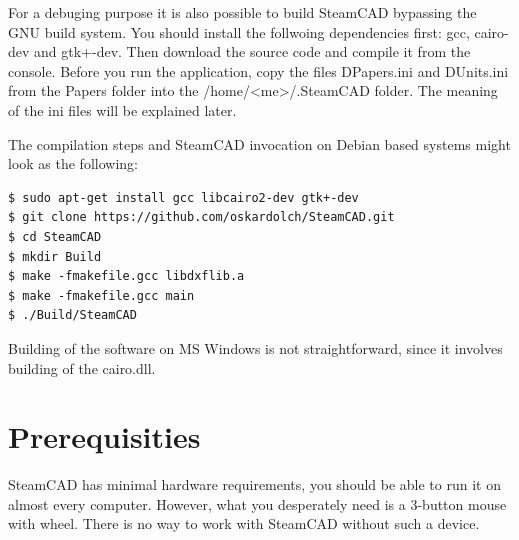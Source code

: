 For a debuging purpose it is also possible to build SteamCAD bypassing the GNU build system.
You should install the follwoing dependencies first: gcc, cairo-dev and gtk+-dev.
Then download the source code and compile it from the console. Before you run
the application, copy the files DPapers.ini and DUnits.ini from the Papers folder into the
/home/<me>/.SteamCAD folder. The meaning of the ini files will be explained later.

The compilation steps and SteamCAD invocation on Debian based systems might look as the following:
\begin{verbatim}
$ sudo apt-get install gcc libcairo2-dev gtk+-dev
$ git clone https://github.com/oskardolch/SteamCAD.git
$ cd SteamCAD
$ mkdir Build
$ make -fmakefile.gcc libdxflib.a
$ make -fmakefile.gcc main
$ ./Build/SteamCAD
\end{verbatim}

Building of the software on MS Windows is not straightforward, since it involves building of
the cairo.dll.

\section{Prerequisities}

SteamCAD has minimal hardware requirements, you should be able to run it on almost every
computer. However, what you desperately need is a 3-button mouse with wheel. There is no way
to work with SteamCAD without such a device.

